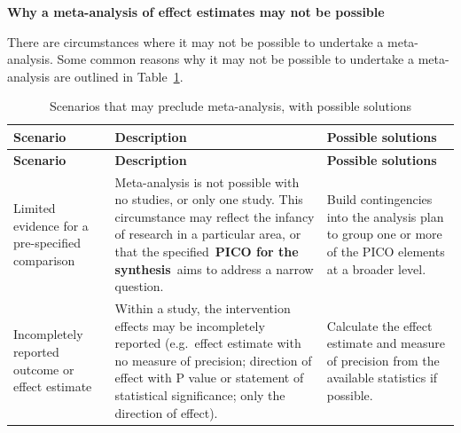 \documentclass[
  11pt,
  a4paper,
  DIV=11,
  numbers=noendperiod]{scrreprt}
\begin{document}
\textbf{Why a meta-analysis of effect estimates may not be possible}

There are circumstances where it may not be possible to undertake a
meta-analysis. Some common reasons why it may not be possible to
undertake a meta-analysis are outlined in Table~\ref{tbl-no-ma}.

\begin{longtable}[]{@{}
  >{\raggedright\arraybackslash}p{}
  >{\raggedright\arraybackslash}p{}
  >{\raggedright\arraybackslash}p{}@{}}
\caption{Scenarios that may preclude meta-analysis, with possible
solutions}\label{tbl-no-ma}\tabularnewline
\toprule\noalign{}
\begin{minipage}[b]{\linewidth}\raggedright
\textbf{Scenario}
\end{minipage} & \begin{minipage}[b]{\linewidth}\raggedright
\textbf{Description}
\end{minipage} & \begin{minipage}[b]{\linewidth}\raggedright
\textbf{Possible solutions}
\end{minipage} \\
\midrule\noalign{}
\endfirsthead
\toprule\noalign{}
\begin{minipage}[b]{\linewidth}\raggedright
\textbf{Scenario}
\end{minipage} & \begin{minipage}[b]{\linewidth}\raggedright
\textbf{Description}
\end{minipage} & \begin{minipage}[b]{\linewidth}\raggedright
\textbf{Possible solutions}
\end{minipage} \\
\midrule\noalign{}
\endhead
\bottomrule\noalign{}
\endlastfoot
Limited evidence for a pre-specified comparison & Meta-analysis is not
possible with no studies, or only one study. This circumstance may
reflect the infancy of research in a particular area, or that the
specified~\textbf{PICO for the synthesis}~aims to address a narrow
question. & Build contingencies into the analysis plan to group one or
more of the PICO elements at a broader level. \\
Incompletely reported outcome or effect estimate & Within a study, the
intervention effects may be incompletely reported (e.g.~effect estimate
with no measure of precision; direction of effect with P value or
statement of statistical significance; only the direction of effect). &
Calculate the effect estimate and measure of precision from the
available statistics if possible.


\end{longtable}
\end{document}
